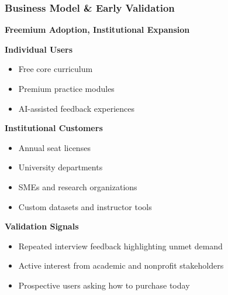 \documentclass[aspectratio=169]{beamer}
\begin{document}
\begin{frame}
\frametitle{\textcolor{AccentPink}{Business Model \& Early Validation}}

\Large \textbf{Freemium Adoption, Institutional Expansion}

\vspace{0.3cm}

\textbf{Individual Users}
\begin{itemize}
\item Free core curriculum
\item Premium practice modules
\item AI-assisted feedback experiences
\end{itemize}

\textbf{Institutional Customers}
\begin{itemize}
\item Annual seat licenses
\item University departments
\item SMEs and research organizations
\item Custom datasets and instructor tools
\end{itemize}

\textbf{Validation Signals}
\begin{itemize}
\item Repeated interview feedback highlighting unmet demand
\item Active interest from academic and nonprofit stakeholders
\item Prospective users asking how to purchase today
\end{itemize}
\end{frame}
\end{document}
